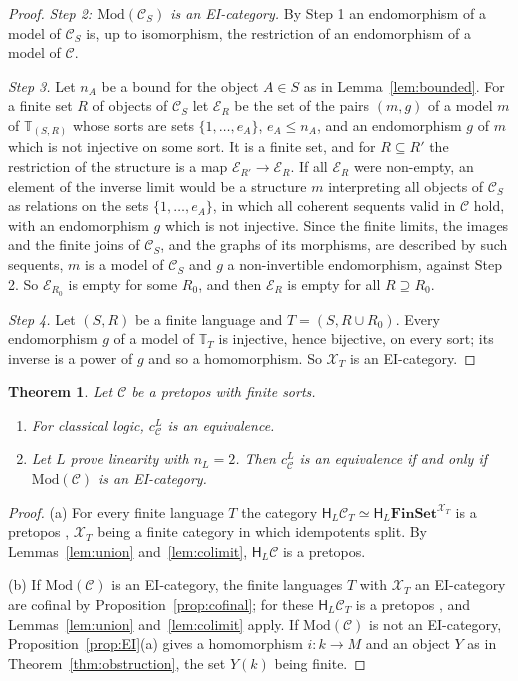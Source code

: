 \documentclass[11pt]{amsart}
\newtheorem{thm}{Theorem}[section]
\theoremstyle{definition}
\newcommand{\Fin}{\mathbf{FinSet}}
\newcommand{\Mod}{\mathrm{Mod}}
\newcommand{\HH}{\mathsf H}
\newcommand{\cX}{\mathcal X}
\newcommand{\cC}{\mathcal C}
\newcommand{\bT}{\mathbb T}
\begin{document}
\begin{proof}
\emph{Step 2: $\Mod(\cC_S)$ is an EI-category.} By Step 1 an
endomorphism of a model of $\cC_S$ is, up to isomorphism, the
restriction of an endomorphism of a model of $\cC$.

\emph{Step 3.} Let $n_A$ be a bound for the object $A\in S$ as in
Lemma~\ref{lem:bounded}. For a finite set $R$ of objects of $\cC_S$
let $\mathcal E_R$ be the set of the pairs $(m,g)$ of a model $m$ of
$\bT_{(S,R)}$ whose sorts are sets $\{1,\dots,e_A\}$, $e_A\le n_A$,
and an endomorphism $g$ of $m$ which is not injective on some sort. It
is a finite set, and for $R\subseteq R'$ the restriction of the
structure is a map $\mathcal E_{R'}\to\mathcal E_R$. If all
$\mathcal E_R$ were non-empty, an element of the inverse limit would
be a structure $m$ interpreting all objects of $\cC_S$ as relations
on the sets $\{1,\dots,e_A\}$, in which all coherent sequents valid
in $\cC$ hold, with an endomorphism $g$ which is not injective. Since
the finite limits, the images and the finite joins of $\cC_S$, and the
graphs of its morphisms, are described by such sequents, $m$ is a
model of $\cC_S$ and $g$ a non-invertible endomorphism, against
Step 2. So $\mathcal E_{R_0}$ is empty for some $R_0$, and then
$\mathcal E_R$ is empty for all $R\supseteq R_0$.

\emph{Step 4.} Let $(S,R)$ be a finite language and $T=(S,R\cup R_0)$.
Every endomorphism $g$ of a model of $\bT_T$ is injective, hence
bijective, on every sort; its inverse is a power of $g$ and so a
homomorphism. So $\cX_T$ is an EI-category.
\end{proof}

\begin{thm}\label{thm:two}
Let $\cC$ be a pretopos with finite sorts.
\begin{enumerate}
\item[(a)] For classical logic, $c^L_\cC$ is an equivalence.
\item[(b)] Let $L$ prove linearity with $n_L=2$. Then $c^L_\cC$ is an
equivalence if and only if $\Mod(\cC)$ is an EI-category.
\end{enumerate}
\end{thm}
\begin{proof}
(a) For every finite language $T$ the category $\HH_L\cC_T\simeq\HH_L
\Fin^{\cX_T}$ is a pretopos \cite[Prop.~5.3]{Strings}, $\cX_T$ being a
finite category in which idempotents split. By Lemmas~\ref{lem:union}
and~\ref{lem:colimit}, $\HH_L\cC$ is a pretopos.

(b) If $\Mod(\cC)$ is an EI-category, the finite languages $T$ with
$\cX_T$ an EI-category are cofinal by Proposition~\ref{prop:cofinal};
for these $\HH_L\cC_T$ is a pretopos \cite[Cor.~6.3]{Strings}, and
Lemmas~\ref{lem:union} and~\ref{lem:colimit} apply. If $\Mod(\cC)$ is
not an EI-category, Proposition~\ref{prop:EI}(a) gives a homomorphism
$i\colon k\to M$ and an object $Y$ as in
Theorem~\ref{thm:obstruction}, the set $Y(k)$ being finite.
\end{proof}
\end{document}
